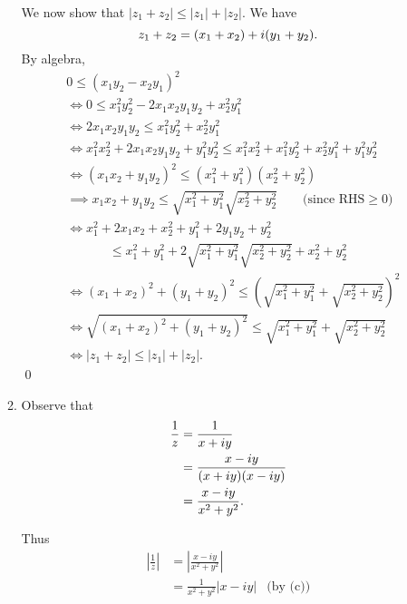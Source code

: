 \documentclass[oneside]{article}
\newcommand\abs[1]{\left|#1\right|}
\begin{document}
\begin{enumerate}[label=\textbf{\arabic*.}]
\begin{enumerate}[label=\textbf{(\alph*)}]
      We now show that $\abs{z_1 + z_2} \leq \abs{z_1} + \abs{z_2}$. We have
      \[
        z_1 + z_2 = (x_1 + x_2) + i(y_1 + y_2) \text.
      \]
      By algebra,
      \begin{align*}
        & 0 \leq (x_1y_2-x_2y_1)^2 \\
        & \iff 0 \leq x_1^2y_2^2 - 2x_1x_2y_1y_2 + x_2^2y_1^2 \\
        & \iff 2x_1x_2y_1y_2 \leq x_1^2y_2^2 + x_2^2y_1^2 \\
        & \iff x_1^2x_2^2 + 2x_1x_2y_1y_2 + y_1^2y_2^2
          \leq x_1^2x_2^2 + x_1^2y_2^2 + x_2^2y_1^2 + y_1^2y_2^2 \\
        & \iff (x_1x_2 + y_1y_2)^2
          \leq \left(x_1^2 + y_1^2\right)\left(x_2^2 + y_2^2\right) \\
        & \implies x_1x_2 + y_1y_2
          \leq \sqrt{x_1^2 + y_1^2}\sqrt{x_2^2 + y_2^2} \hspace{20pt} \text{ (since $\mathrm{RHS} \geq 0$)} \\
        & \iff x_1^2 + 2x_1x_2 + x_2^2 + y_1^2 + 2y_1y_2 + y_2^2
          \\&\hspace{40pt} \leq x_1^2 + y_1^2
            + 2\sqrt{x_1^2 + y_1^2}\sqrt{x_2^2 + y_2^2}
            + x_2^2 + y_2^2 \\
        & \iff (x_1 + x_2)^2 + (y_1 + y_2)^2
          \leq \left(\sqrt{x_1^2 + y_1^2} + \sqrt{x_2^2 + y_2^2}\right)^2 \\
        & \iff \sqrt{(x_1 + x_2)^2 + (y_1 + y_2)^2}
          \leq \sqrt{x_1^2 + y_1^2} + \sqrt{x_2^2 + y_2^2} \\
        & \iff \abs{z_1 + z_2} \leq \abs{z_1} + \abs{z_2} \text{.}
      \end{align*}\qed

    \item Observe that \begin{align*}
        \frac{1}{z} &= \frac{1}{x + iy} \\
        &= \frac{x - iy}{(x + iy)(x - iy)} \\
        &= \frac{x - iy}{x^2 + y^2}\text.
      \end{align*}

      Thus \begin{align*}
        \abs{\frac{1}{z}} &= \abs{\frac{x - iy}{x^2 + y^2}} \\
        &= \frac{1}{x^2 + y^2}\abs{x - iy} & \text{(by (c))}
      \end{align*}


\end{enumerate}
\end{enumerate}
\end{document}
